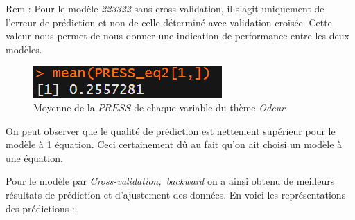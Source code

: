 \documentclass[a4paper,french,10pt]{article}
\begin{document}
Rem : Pour le modèle \textit{223322} sans cross-validation, il s'agit uniquement de l'erreur de prédiction et non de celle déterminé avec validation croisée. Cette valeur nous permet de nous donner une indication de performance entre les deux modèles. 

\begin{figure}[htp] 
	\centering
	\includegraphics[scale=0.45]{images/mean_PRESS_eq2.png}
	\caption{Moyenne de la $PRESS$ de chaque variable du thème \textit{Odeur}}
\end{figure}

On peut observer que le qualité de prédiction est nettement supérieur pour le modèle à 1 équation. Ceci certainement dû au fait qu'on ait choisi un modèle à une équation.\newline

Pour le modèle par \textit{Cross-validation,~backward} on a ainsi obtenu de meilleurs résultats de prédiction et d'ajustement des données. En voici les représentations des prédictions : 
\end{document}
